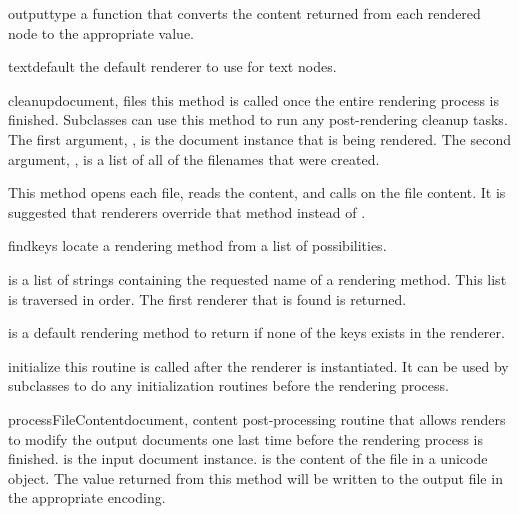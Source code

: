 \begin{memberdesc}[Renderer]{outputtype}
a function that converts the content returned from each rendered
node to the appropriate value.
\end{memberdesc}

\begin{memberdesc}[Renderer]{textdefault}
the default renderer to use for text nodes.
\end{memberdesc}


\begin{methoddesc}[Renderer]{cleanup}{document, files}
this method is called once the entire rendering process is finished.  
Subclasses can use this method to run any post-rendering cleanup tasks.
The first argument, , is the document instance that is
being rendered.  The second argument, , is a list of all of the
filenames that were created.

This method opens each file, reads the content, and 
calls  on the file content.  It is suggested
that renderers override that method instead of .
\end{methoddesc}

\begin{methoddesc}[Renderer]{find}{keys}
locate a rendering method from a list of possibilities.  

 is a list of strings containing the requested name of a
rendering method.  This list is traversed in order.  The first renderer
that is found is returned.

 is a default rendering method to return if none of the keys
exists in the renderer.
\end{methoddesc}

\begin{methoddesc}[Renderer]{initialize}{}
this routine is called after the renderer is instantiated.  It can be used
by subclasses to do any initialization routines before the rendering process.
\end{methoddesc}

\begin{methoddesc}[Renderer]{processFileContent}{document, content}
post-processing routine that allows renders to modify the output documents
one last time before the rendering process is finished.  
is the input document instance.   is the content of the 
file in a unicode object.  The value returned from this method will be
written to the output file in the appropriate encoding.
\end{methoddesc}

